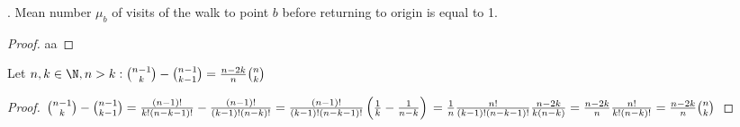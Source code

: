 \begin{thm}\label{thm-mean_number_visits}
 \Lrws. Mean number $\mu_b$ of visits of the walk to point $b$ before returning to origin is equal to 1.
\end{thm}
\begin{proof}
 aa
\end{proof}

\begin{lemma}\label{lemma-binom_identity_identity}
 Let $n,k \in \N, n>k:\binom{n-1}{k}-\binom{n-1}{k-1}=\frac{n-2k}{n}\binom{n}{k}$
\end{lemma}
\begin{proof}
 $\binom{n-1}{k}-\binom{n-1}{k-1}
 =\frac{ \left( n-1 \right) !}{k! \left( n-k-1 \right) !}-\frac{ \left( n-1 \right) !}{ \left( k-1 \right) ! \left( n-k \right) !}
 =\frac{ \left( n-1 \right) !}{ \left( k-1 \right) ! \left( n-k-1 \right) !} \left( \frac{1}{k}-\frac{1}{n-k} \right)\\
 =\frac{1}{n}\frac{n!}{ \left( k-1 \right) ! \left( n-k-1 \right) !}\frac{n-2k}{k \left( n-k \right) }
 =\frac{n-2k}{n}\frac{n!}{k! \left( n-k \right) !}=\frac{n-2k}{n}\binom{n}{k}$
\end{proof}

